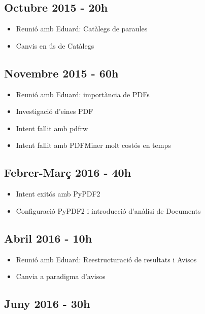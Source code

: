 \documentclass{article}
\begin{document}
\subsection{Octubre 2015 - 20h}

\begin{itemize}
    \item Reunió amb Eduard: Catàlegs de paraules
    \item Canvis en ús de Catàlegs
\end{itemize}

\subsection{Novembre 2015 - 60h}

\begin{itemize}
    \item Reunió amb Eduard: importància de PDFs
    \item Investigació d'eines PDF
    \item Intent fallit amb pdfrw
    \item Intent fallit amb PDFMiner molt costós en temps
\end{itemize}

\subsection{Febrer-Març 2016 - 40h}

\begin{itemize}
    \item Intent exitós amb PyPDF2
    \item Configuració PyPDF2 i introducció d'anàlisi de Documents
\end{itemize}

\subsection{Abril 2016 - 10h}

\begin{itemize}
    \item Reunió amb Eduard: Reestructuració de resultats i Avisos
    \item Canvia a paradigma d'avisos
\end{itemize}

\subsection{Juny 2016 - 30h}
\end{document}
